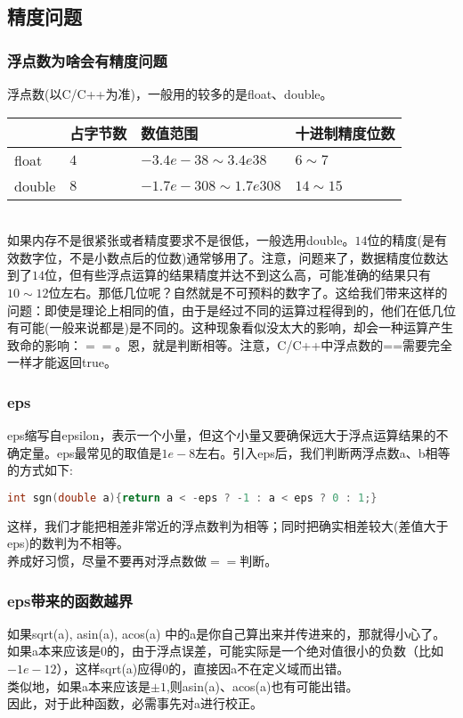 \subsection{精度问题}
	\subsubsection{浮点数为啥会有精度问题}
	浮点数(以C/C++为准)，一般用的较多的是float、double。\\
	\begin{table}[htbp]
		\centering
		\begin{tabular}{l|l|l|l}
		\toprule
		&占字节数&数值范围&十进制精度位数\\
		\midrule
		float&$4$&$-3.4e-38\sim 3.4e38$&$6\sim 7$\\
		double&$8$&$-1.7e-308\sim 1.7e308$&$14\sim 15$\\
		\bottomrule
		\end{tabular}
	\end{table}
	~\\
	如果内存不是很紧张或者精度要求不是很低，一般选用double。$14$位的精度(是有效数字位，不是小数点后的位数)通常够用了。注意，问题来了，数据精度位数达到了$14$位，但有些浮点运算的结果精度并达不到这么高，可能准确的结果只有$10\sim 12$位左右。那低几位呢？自然就是不可预料的数字了。这给我们带来这样的问题：即使是理论上相同的值，由于是经过不同的运算过程得到的，他们在低几位有可能(一般来说都是)是不同的。这种现象看似没太大的影响，却会一种运算产生致命的影响：$==$。恩，就是判断相等。注意，C/C++中浮点数的==需要完全一样才能返回true。\\
	
	\subsubsection{eps}
	eps缩写自epsilon，表示一个小量，但这个小量又要确保远大于浮点运算结果的不确定量。eps最常见的取值是$1e-8$左右。引入eps后，我们判断两浮点数a、b相等的方式如下:
	\begin{lstlisting}[language=c++]
int sgn(double a){return a < -eps ? -1 : a < eps ? 0 : 1;}
	\end{lstlisting}
	这样，我们才能把相差非常近的浮点数判为相等；同时把确实相差较大(差值大于eps)的数判为不相等。\\
	养成好习惯，尽量不要再对浮点数做$==$判断。\\

	\subsubsection{eps带来的函数越界}
	如果sqrt(a), asin(a), acos(a) 中的a是你自己算出来并传进来的，那就得小心了。\\
	如果a本来应该是$0$的，由于浮点误差，可能实际是一个绝对值很小的负数（比如$-1e-12$），这样sqrt(a)应得$0$的，直接因a不在定义域而出错。\\
	类似地，如果a本来应该是$\pm 1$,则asin(a)、acos(a)也有可能出错。\\
	因此，对于此种函数，必需事先对a进行校正。\\
	
